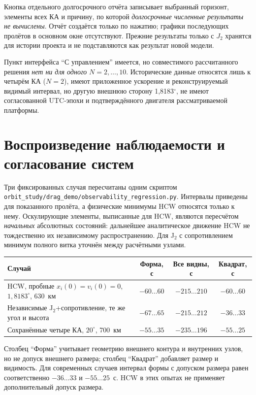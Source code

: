\documentclass[a4paper,12pt]{article}
\begin{document}
Кнопка отдельного долгосрочного отчёта записывает выбранный горизонт,
элементы всех КА и причину, по которой \emph{долгосрочные численные
результаты не вычислены}. Отчёт создаётся только по нажатию;
графики последующих пролётов в основном окне отсутствуют.
Прежние результаты только с $J_2$ хранятся для истории проекта
и не подставляются как результат новой модели.

Пункт интерфейса ``С управлением'' имеется, но совместимого
рассчитанного решения \emph{нет ни для одного} $N=2,\ldots,10$.
Исторические данные относятся лишь к четырём КА ($N=2$), имеют
приложенное ускорение и реконструируемый видимый интервал,
но другую внешнюю сторону 1{,}8183$^\circ$, не имеют согласованной
UTC-эпохи и подтверждённого двигателя рассматриваемой платформы.

\section{Воспроизведение наблюдаемости и согласование систем}

Три фиксированных случая пересчитаны одним скриптом
\texttt{orbit\_study/drag\_demo/observability\_regression.py}.
Интервалы приведены для показанного пролёта, а физические минимумы
HCW относятся только к нему. Оскулирующие элементы, выписанные для
HCW, являются пересчётом \emph{начальных} абсолютных состояний:
дальнейшее аналитическое движение HCW не тождественно их независимому
распространению. Для J$_2$ с сопротивлением минимум полного витка
уточнён между расчётными узлами.

\begin{center}
\begin{tabular}{@{}p{4.1cm}ccc@{}}
\toprule
Случай & Форма, с & Все видны, с & Квадрат, с\\
\midrule
HCW, пробные $x_i(0)=v_i(0)=0$, $1{,}8183^\circ$, 630~км
 & $-60\ldots60$ & $-215\ldots210$ & $-60\ldots60$\\
Независимые J$_2$+сопротивление, те же угол и высота
 & $-67\ldots65$ & $-215\ldots212$ & $-36\ldots33$\\
Сохранённые четыре КА, $20^\circ$, 700~км
 & $-55\ldots35$ & $-235\ldots196$ & $-55\ldots25$\\
\bottomrule
\end{tabular}
\end{center}
Столбец ``Форма'' учитывает геометрию внешнего контура и внутренних
узлов, но не допуск внешнего размера; столбец ``Квадрат'' добавляет
размер и видимость. Для современных случаев интервал формы
с допуском размера равен соответственно $-36\ldots33$ и
$-55\ldots25$~с. HCW в этих опытах не применяет дополнительный
допуск размера.
\end{document}
